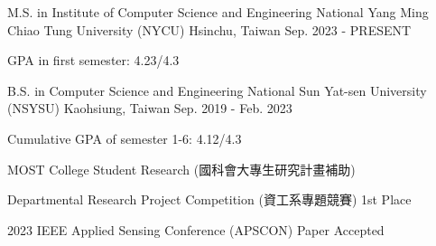 

\begin{cventries}

  \cventry
    {M.S. in Institute of Computer Science and Engineering} %
    {National Yang Ming Chiao Tung University (NYCU)} %
    {Hsinchu, Taiwan} %
    {Sep. 2023 - PRESENT} %
    {
      \begin{cvitems} %
        \item {GPA in first semester: 4.23/4.3}
      \end{cvitems}
    }

  \cventry
    {B.S. in Computer Science and Engineering} %
    {National Sun Yat-sen University (NSYSU)} %
    {Kaohsiung, Taiwan} %
    {Sep. 2019 - Feb. 2023} %
    {
      \begin{cvitems} %
        \item {Cumulative GPA of semester 1-6: 4.12/4.3}
        \item {MOST College Student Research (國科會大專生研究計畫補助)}
        \item {Departmental Research Project Competition (資工系專題競賽) 1st Place}
        \item {2023 IEEE Applied Sensing Conference (APSCON) Paper Accepted}
      \end{cvitems}
    }

\end{cventries}
